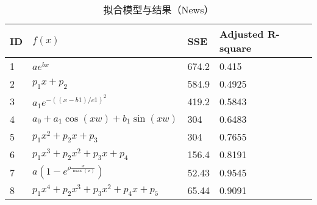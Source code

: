 \begin{table}[tb]
\caption{拟合模型与结果（News）} 
\label{tb:chap_append:fit_functions}
\centering
\wuhao
\begin{tabularx}{0.99\linewidth}{p{}p{}p{}p{}}
\toprule
ID& $f(x)$ & SSE & Adjusted R-square\\
\midrule
1&$ae^{bx}$ &  674.2 & 0.415   \\
2&$p_1 x + p_2$ & 584.9   & 0.4925  \\
3&$a_1e^{-((x-b1)/c1)^2}$&419.2   &  0.5843 \\
4&$a_0 + a_1\cos(xw) + b_1\sin(xw)$&  304 & 0.6483  \\
5&$p_1x^2 + p_2x + p_3$ & 304    & 0.7655  \\
6&$p_1x^3 + p_2x^2 + p_3x + p_4$& 156.4  &  0.8191 \\
7&$a(1-e^{ \rho \frac{x}{\max(x)}})$ & 52.43   & 0.9545  \\
8&$p_1x^4 + p_2x^3 + p_3x^2 + p_4x + p_5$&  65.44  & 0.9091  \\
\bottomrule
\end{tabularx}
\end{table}


